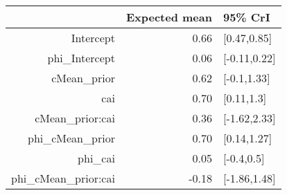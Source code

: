 \begin{tabular}{rrl}
  \hline
 & Expected mean & 95\% CrI \\ 
  \hline
Intercept & 0.66 & [0.47,0.85] \\ 
  phi\_Intercept & 0.06 & [-0.11,0.22] \\ 
  cMean\_prior & 0.62 & [-0.1,1.33] \\ 
  cai & 0.70 & [0.11,1.3] \\ 
  cMean\_prior:cai & 0.36 & [-1.62,2.33] \\ 
  phi\_cMean\_prior & 0.70 & [0.14,1.27] \\ 
  phi\_cai & 0.05 & [-0.4,0.5] \\ 
  phi\_cMean\_prior:cai & -0.18 & [-1.86,1.48] \\ 
   \hline
\end{tabular}

